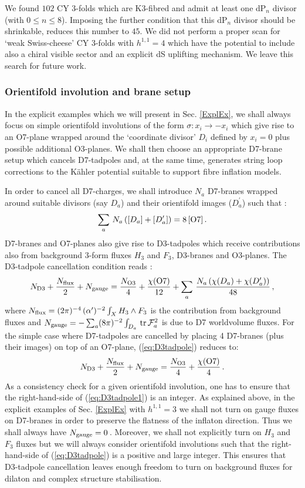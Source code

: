 \documentclass[11pt,a4paper]{article}
\newcommand{\be}{\begin{equation}}
\newcommand{\ee}{\end{equation}}
\begin{document}
We found $102$ CY 3-folds which are K3-fibred and admit at least one dP$_n$ divisor (with $0\leq n\leq 8$). Imposing the further condition that this dP$_n$ divisor should be shrinkable, reduces this number to $45$. We did not perform a proper scan for `weak Swiss-cheese' CY 3-folds with $h^{1,1}=4$ which have the potential to include also a chiral visible sector and an explicit dS uplifting mechanism. We leave this search for future work.

\subsubsection{Orientifold involution and brane setup}

In the explicit examples which we will present in Sec. \ref{ExplEx}, we shall always focus on simple orientifold involutions of the form $\sigma: x_i \to -x_i$ which give rise to an O7-plane wrapped around the `coordinate divisor' $D_i$ defined by $x_i = 0$ plus possible additional O3-planes. We shall then choose an appropriate D7-brane setup which cancels D7-tadpoles and, at the same time, generates string loop corrections to the K\"ahler potential suitable to support fibre inflation models.

In order to cancel all D7-charges, we shall introduce $N_a$ D7-branes wrapped around suitable divisors (say $D_a$) and their orientifold images ($D_a^\prime$) such that \cite{Blumenhagen:2008zz}:
\be
\sum_a\, N_a \left([D_a] + [D_a^\prime] \right) = 8\, [{\rm O7}]\,.
\label{eq:D7tadpole}
\ee
D7-branes and O7-planes also give rise to D3-tadpoles which receive contributions also from background 3-form fluxes $H_3$ and $F_3$, D3-branes and O3-planes. The D3-tadpole cancellation condition reads \cite{Blumenhagen:2008zz}:
\be
N_{\rm D3} + \frac{N_{\rm flux}}{2} + N_{\rm gauge} = \frac{N_{\rm O3}}{4} + \frac{\chi({\rm O7})}{12} + \sum_a\, \frac{N_a \left(\chi(D_a) + \chi(D_a^\prime) \right) }{48}\,,
\label{eq:D3tadpole}
\ee
where $N_{\rm flux} = (2\pi)^{-4} \, (\alpha^\prime)^{-2}\int_X H_3 \wedge F_3$ is the contribution from background fluxes and $N_{\rm gauge} = -\sum_a (8 \pi)^{-2} \int_{D_a}\, {\rm tr}\, {\cal F}_a^2$ is due to D7 worldvolume fluxes. For the simple case where D7-tadpoles are cancelled by placing 4 D7-branes (plus their images) on top of an O7-plane, (\ref{eq:D3tadpole}) reduces to:
\be
N_{\rm D3} + \frac{N_{\rm flux}}{2} + N_{\rm gauge} =\frac{N_{\rm O3}}{4} + \frac{\chi({\rm O7})}{4}\,.
\label{eq:D3tadpole1}
\ee
As a consistency check for a given orientifold involution, one has to ensure that the right-hand-side of (\ref{eq:D3tadpole1}) is an integer. As explained above, in the explicit examples of Sec. \ref{ExplEx} with $h^{1,1}=3$ we shall not turn on gauge fluxes on D7-branes in order to preserve the flatness of the inflaton direction. Thus we shall always have $N_{\rm gauge}=0\,$. Moreover, we shall not explicitly turn on $H_3$ and $F_3$ fluxes but we will always consider orientifold involutions such that the right-hand-side of (\ref{eq:D3tadpole}) is a positive and large integer. This ensures that D3-tadpole cancellation leaves enough freedom to turn on background fluxes for dilaton and complex structure stabilisation. 
\end{document}

